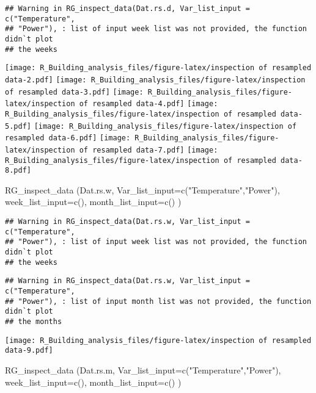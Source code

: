 \documentclass[
]{article}
\newenvironment{Shaded}{\begin{snugshade}}{\end{snugshade}}
\newcommand{\AttributeTok}[1]{\textcolor[rgb]{0.77,0.63,0.00}{#1}}
\newcommand{\FunctionTok}[1]{\textcolor[rgb]{0.00,0.00,0.00}{#1}}
\newcommand{\NormalTok}[1]{#1}
\newcommand{\StringTok}[1]{\textcolor[rgb]{0.31,0.60,0.02}{#1}}
\begin{document}
\begin{verbatim}
## Warning in RG_inspect_data(Dat.rs.d, Var_list_input = c("Temperature",
## "Power"), : list of input week list was not provided, the function didn`t plot
## the weeks
\end{verbatim}

\texttt{[image: R\_Building\_analysis\_files/figure-latex/inspection of resampled data-2.pdf]}
\texttt{[image: R\_Building\_analysis\_files/figure-latex/inspection of resampled data-3.pdf]}
\texttt{[image: R\_Building\_analysis\_files/figure-latex/inspection of resampled data-4.pdf]}
\texttt{[image: R\_Building\_analysis\_files/figure-latex/inspection of resampled data-5.pdf]}
\texttt{[image: R\_Building\_analysis\_files/figure-latex/inspection of resampled data-6.pdf]}
\texttt{[image: R\_Building\_analysis\_files/figure-latex/inspection of resampled data-7.pdf]}
\texttt{[image: R\_Building\_analysis\_files/figure-latex/inspection of resampled data-8.pdf]}

\begin{Shaded}
\begin{Highlighting}[]
  \FunctionTok{RG\_inspect\_data}\NormalTok{ (Dat.rs.w,}
                   \AttributeTok{Var\_list\_input=}\FunctionTok{c}\NormalTok{(}\StringTok{"Temperature"}\NormalTok{,}\StringTok{"Power"}\NormalTok{),}
                   \AttributeTok{week\_list\_input=}\FunctionTok{c}\NormalTok{(),}
                   \AttributeTok{month\_list\_input=}\FunctionTok{c}\NormalTok{()}
\NormalTok{  )  }
\end{Highlighting}
\end{Shaded}

\begin{verbatim}
## Warning in RG_inspect_data(Dat.rs.w, Var_list_input = c("Temperature",
## "Power"), : list of input week list was not provided, the function didn`t plot
## the weeks
\end{verbatim}

\begin{verbatim}
## Warning in RG_inspect_data(Dat.rs.w, Var_list_input = c("Temperature",
## "Power"), : list of input month list was not provided, the function didn`t plot
## the months
\end{verbatim}

\texttt{[image: R\_Building\_analysis\_files/figure-latex/inspection of resampled data-9.pdf]}

\begin{Shaded}
\begin{Highlighting}[]
  \FunctionTok{RG\_inspect\_data}\NormalTok{ (Dat.rs.m,}
                   \AttributeTok{Var\_list\_input=}\FunctionTok{c}\NormalTok{(}\StringTok{"Temperature"}\NormalTok{,}\StringTok{"Power"}\NormalTok{),}
                   \AttributeTok{week\_list\_input=}\FunctionTok{c}\NormalTok{(),}
                   \AttributeTok{month\_list\_input=}\FunctionTok{c}\NormalTok{()}
\NormalTok{  )}
\end{Highlighting}
\end{Shaded}
\end{document}
